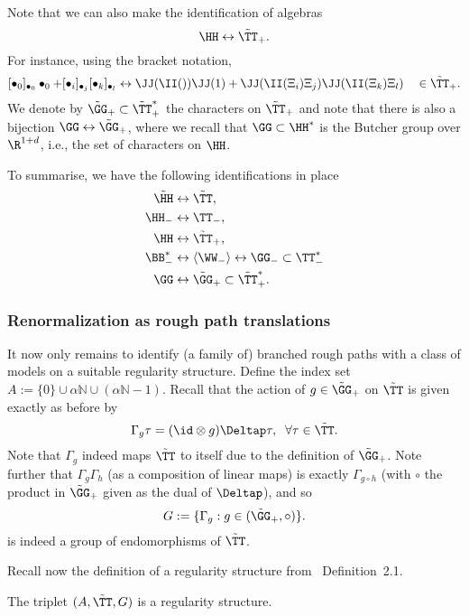 \documentclass{article}
\begin{document}
Note that we can also make the identification of algebras 
$$\HH \leftrightarrow \tilde \TT_+.$$ 
For instance, using the bracket notation,
\[    [\bullet_0]_{\bullet_0} \bullet_0 + [\bullet_i]_{\bullet_j} [\bullet_k]_{\bullet_l} \leftrightarrow   \JJ (\II() )  \JJ (1) + \JJ(  \II(\Xi_i) \Xi_j ) \JJ(  \II(\Xi_k) \Xi_l) \quad \in \tilde \TT_+.
\] 
We denote by $\tilde \GG_+ \subset \tilde \TT_+^*$ the characters on $\tilde \TT_+$ and note that there is also a bijection $\GG \leftrightarrow \tilde\GG_+$, where we recall that $\GG\subset\HH^*$ is the Butcher group over $\R^{1+d}$, i.e.,
the set of characters on $\HH$.

To summarise, we have the following identifications in place
\begin{align*}
\tilde \HH &\leftrightarrow \tilde \TT, \\
\HH_- &\leftrightarrow \TT_-, \\
\HH &\leftrightarrow \tilde \TT_+, \\
\BB_-^* &\leftrightarrow \langle \WW_- \rangle \leftrightarrow \GG_- \subset \TT_-^* \\
\GG &\leftrightarrow \tilde \GG_+ \subset \tilde \TT_+^*.
\end{align*}

\subsubsection{Renormalization as rough path translations} 
It now only remains to identify (a family of) branched rough paths with a class of models on a suitable regularity structure. Define the index set $A := \{0\} \cup \alpha\mathbb{N}\cup(\alpha\mathbb{N}-1)$. Recall that the action of $g \in \tilde \GG_+$ on $\tilde \TT$ is given exactly as before by
\[
\Gamma_g \tau = (\id \otimes g)\Deltap \tau, \; \; \forall \tau \in \tilde \TT.
\]
Note that $\Gamma_g$ indeed maps $\tilde\TT$ to itself due to the definition of $\tilde \GG_+$. Note further that
$\Gamma_g \Gamma_h$ (as a composition of linear maps) is exactly $\Gamma_{g \circ h}$ (with $\circ$ the product in $\tilde \GG_+$ given as the dual of $\Deltap$), and so
$$
     G := \{ \Gamma_g:  g \in (\tilde \GG_+, \circ) \}. 
$$
is indeed a group of endomorphisms of $\tilde\TT$.

Recall now the definition of a regularity structure from~\cite{Hairer14} Definition~2.1.

\begin{lemma} 
The triplet $(A,\tilde \TT, G)$ is a regularity structure.
\end{lemma}
\end{document}
